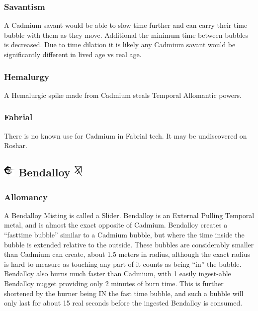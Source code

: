 \documentclass[conference]{IEEEtran}
\begin{document}
\subsubsection*{\textbf{Savantism}}
A Cadmium savant would be able to slow time further and can carry their time bubble with them as they move.\cite{Bubble-move}\cite{bubble-savant} Additional the minimum time between bubbles is decreased.\cite{TLM-CH8}  Due to time dilation it is likely any Cadmium savant would be significantly different in lived age vs real age.\\
\subsubsection*{\textbf{Hemalurgy}}
A Hemalurgic spike made from Cadmium steals Temporal Allomantic powers.\cite{HE-TB}\\
\subsubsection*{\textbf{Fabrial}}
There is no known use for Cadmium in Fabrial tech.  It may be undiscovered on Roshar.\\

\subsection*{\includegraphics[height=1em]{images/Bendalloy.png}  \textbf{Bendalloy} \includegraphics[height=1em]{images/Bendalloy_(Feruchemy).png}}
\subsubsection*{\textbf{Allomancy}}
A Bendalloy Misting is called a Slider.\cite{ARS}  Bendalloy is an External Pulling Temporal metal,\cite{AL-TB} and is almost the exact opposite of Cadmium.  Bendalloy creates a ``fasttime bubble'' similar to a Cadmium bubble, but where the time inside the bubble is extended relative to the outside.\cite{ARS}  These bubbles are considerably smaller than Cadmium can create, about 1.5 meters in radius,\cite{AoL-CH18} although the exact radius is hard to measure as touching any part of it counts as being ``in'' the bubble.\cite{TLM-CH49}  Bendalloy also burns much faster than Cadmium,\cite{BoM-CH8} with 1 easily ingest-able Bendalloy nugget providing only 2 minutes of burn time.  This is further shortened by the burner being IN the fast time bubble, and such a bubble will only last for about 15 real seconds before the ingested Bendalloy is consumed.\cite{AoL-CH12}
\end{document}
